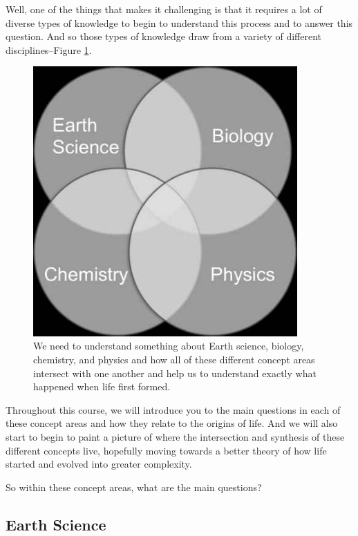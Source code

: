 \documentclass[]{article}
\begin{document}
Well, one of the things that makes it
challenging is that it requires
a lot of diverse types of knowledge to
begin to understand
this process and to answer this question.
And so those types of knowledge draw from
a variety of different disciplines--Figure \ref{fig:tradional:disciplines}.
\begin{figure}[H]
	\begin{center}
		\caption[Traditional disciplines needed for Origin of Life]{We need to understand something about Earth science, biology, chemistry, and physics and how all of these different concept areas intersect with one another and help us to understand exactly what happened when life first formed.}\label{fig:tradional:disciplines}
		\includegraphics[width=0.9\textwidth]{4mainAreas}
	\end{center}
\end{figure}

Throughout this course, we will introduce you to the main questions in each of these concept areas and how they relate to the origins of life. And we will also start to begin to paint a picture of where the intersection and synthesis of these different concepts live, hopefully moving towards a better theory of how life started and evolved into
greater complexity.

So within these concept areas, what are the main questions? 

\subsection{Earth Science}
\end{document}
